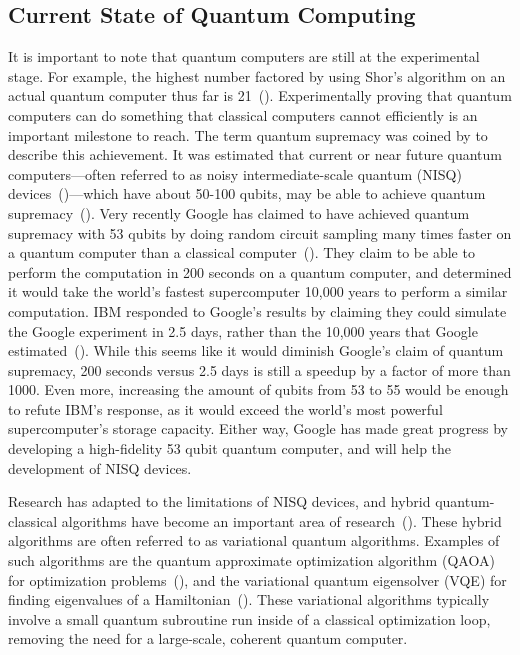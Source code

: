 \documentclass[a4paper,10pt]{article}
\begin{document}
\subsection{Current State of Quantum Computing}
It is important to note that quantum computers are still at the experimental stage.
For example, the highest number factored by using Shor's algorithm on an actual quantum computer thus far is 21~(\cite{shor-21}).
Experimentally proving that quantum computers can do something that classical computers cannot efficiently is an important milestone to reach.
The term quantum supremacy was coined by \cite{preskill-qc} to describe this achievement.
It was estimated that current or near future quantum computers---often referred to as noisy intermediate-scale quantum (NISQ) devices~(\cite{preskill-nisq})---which have about 50-100 qubits, may be able to achieve quantum supremacy~(\cite{boixo2018characterizing}).
Very recently Google has claimed to have achieved quantum supremacy with 53 qubits by doing random circuit sampling many times faster on a quantum computer than a classical computer~(\cite{arute2019quantum}).
They claim to be able to perform the computation in 200 seconds on a quantum computer, and determined it would take the world's fastest supercomputer 10,000 years to perform a similar computation.
IBM responded to Google's results by claiming they could simulate the Google experiment in 2.5 days, rather than the 10,000 years that Google estimated~(\cite{pednault2019leveraging}).
While this seems like it would diminish Google's claim of quantum supremacy, 200 seconds versus 2.5 days is still a speedup by a factor of more than 1000.
Even more, increasing the amount of qubits from 53 to 55 would be enough to refute IBM's response, as it would exceed the world's most powerful supercomputer's storage capacity.
Either way, Google has made great progress by developing a high-fidelity 53 qubit quantum computer, and will help the development of NISQ devices.

Research has adapted to the limitations of NISQ devices, and hybrid quantum-classical algorithms have become an important area of research~(\cite{mcclean2016theory, guerreschi2017practical}).
These hybrid algorithms are often referred to as variational quantum algorithms.
Examples of such algorithms are the quantum approximate optimization algorithm (QAOA) for optimization problems~(\cite{qaoa}), and the variational quantum eigensolver (VQE) for finding eigenvalues of a Hamiltonian~(\cite{vqe}).
These variational algorithms typically involve a small quantum subroutine run inside of a classical optimization loop, removing the need for a large-scale, coherent quantum computer.
\end{document}
